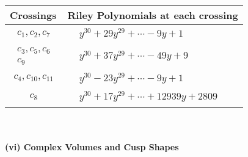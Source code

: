 \documentclass[1p]{elsarticle_modified}
\theoremstyle{definition}
\begin{document}
\begin{tabular}{m{50pt}|m{274pt}}
Crossings & \hspace{64pt}Riley Polynomials at each crossing \\
\hline $$\begin{aligned}c_{1},c_{2},c_{7}\end{aligned}$$&$\begin{aligned}
&y^{30}+29 y^{29}+\cdots-9 y+1
\end{aligned}$\\
\hline $$\begin{aligned}c_{3},c_{5},c_{6}\\c_{9}\end{aligned}$$&$\begin{aligned}
&y^{30}+37 y^{29}+\cdots-49 y+9
\end{aligned}$\\
\hline $$\begin{aligned}c_{4},c_{10},c_{11}\end{aligned}$$&$\begin{aligned}
&y^{30}-23 y^{29}+\cdots-9 y+1
\end{aligned}$\\
\hline $$\begin{aligned}c_{8}\end{aligned}$$&$\begin{aligned}
&y^{30}+17 y^{29}+\cdots+12939 y+2809
\end{aligned}$\\
\hline
\end{tabular}\\~\\
\newpage\flushleft \textbf{(vi) Complex Volumes and Cusp Shapes}
\end{document}
